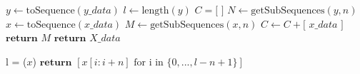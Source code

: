 \begin{algorithm}
\begin{algorithmic}
        \State $y \gets \text{toSequence}(y\_data)$
        \State $l \gets \text{length}(y)$
          
            \State ${C} = \textbf{[ ]}$
            \State ${N} \gets \text{getSubSequences}(y, n)$
                \State $x \gets \text{toSequence}(x\_data)$
                \State ${M} \gets \text{getSubSequences}(x, n)$
                    \State $ {C} \gets  {C} + \text{[ } x\_data \text{ ]}$
                \EndFor
            \EndFor
                \State $\textbf{return } {M}$
            \EndIf
        \EndFor {}
        \State $\textbf{return } X\_data$
        \EndProcedure
    \end{algorithmic}
\hrulefill

    \begin{algorithmic}
          
        \State l = ($x$)
        \State $\textbf{return } [x[i:i+n] \text{ for i in } \{0,...,l-n+1\} ]$

        \EndProcedure
    \end{algorithmic}


\end{algorithm}



